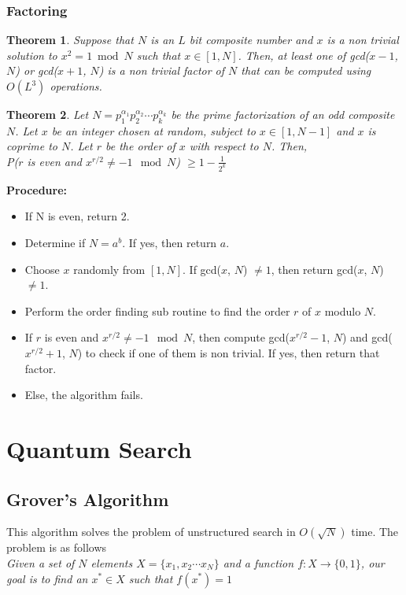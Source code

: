 \documentclass{article}
\newtheorem{theorem}{Theorem}
\begin{document}
\subsubsection{Factoring}
\begin{theorem}
Suppose that $N$ is an $L$ bit composite number and $x$ is a non trivial solution to $x^2 = 1\bmod{N}$ such that $x \in [1, N]$. Then, at least one of gcd($x-1$, $N$) or gcd($x+1$, $N$) is a non trivial factor of $N$ that can be computed using $O(L^3)$ operations.
\end{theorem}
\begin{theorem}
Let $N=p_1^{\alpha_1}p_2^{\alpha_2} \cdots p_k^{\alpha_k}$ be the prime factorization of an odd composite $N$. Let $x$ be an integer chosen at random, subject to $x \in [1, N-1]$ and $x$ is coprime to $N$. Let $r$ be the order of $x$ with respect to $N$. Then,\\[2pt] 
P($r$ is even and $x^{r/2} \neq -1\mod{N}$) $\geq 1-\frac{1}{2^k}$
\end{theorem}
\textbf{Procedure:}
\begin{itemize}
    \item If N is even, return 2.
    \item Determine if $N = a^b$. If yes, then return $a$.
    \item Choose $x$ randomly from $[1, N]$. If gcd($x$, $N$) $\neq 1$, then return gcd($x$, $N$) $\neq 1$.
    \item Perform the order finding sub routine to find the order $r$ of $x$ modulo $N$. 
    \item If $r$ is even and $x^{r/2} \neq -1\mod{N}$, then compute gcd($x^{r/2}-1$, $N$) and gcd($x^{r/2}+1$, $N$) to check if one of them is non trivial. If yes, then return that factor.
    \item Else, the algorithm fails.
\end{itemize}
\cleardoublepage
\section{Quantum Search}
\subsection{Grover's Algorithm}
This algorithm solves the problem of unstructured search in $O(\sqrt{N})$ time. The problem is as follows\\
\emph{Given a set of $N$ elements $X = \{ x_1, x_2 \cdots x_N\}$ and a function $f:X \longrightarrow \{0, 1\}$, our goal is to find an $x^* \in X$ such that $f(x^*) = 1$}
\end{document}
